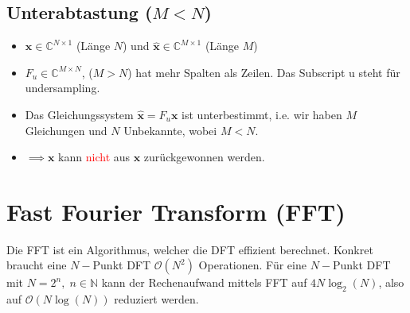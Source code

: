 \documentclass[11pt]{article}
\begin{document}
\vspace*{-0.25cm}
\subsection*{Unterabtastung ($M < N$)}
\vspace*{-0.5cm}
\begin{itemize}
    \item $\mathbf{x} \in \mathbb{C}^{N \times 1}$ (Länge $N$) und $\hat{\mathbf{x}} \in \mathbb{C}^{M \times 1}$ (Länge $M$)
    \item $F_u \in \mathbb{C}^{M\times N}$, ($M > N$) hat mehr Spalten als Zeilen. Das Subscript u steht für undersampling.
    \item Das Gleichungssystem $\hat{\mathbf{x}} = F_u \mathbf{x}$ ist unterbestimmt, i.e. wir haben $M$ Gleichungen und $N$ Unbekannte, wobei $M < N$.
    \item[] $\implies \mathbf{x}$ kann \textcolor{red}{nicht} aus $\mathbf{x}$ zurückgewonnen werden.
\end{itemize}


\vfill \null
\pagebreak

\section*{Fast Fourier Transform (FFT)}
\vspace*{-0.5cm}
Die FFT ist ein Algorithmus, welcher die DFT effizient berechnet. Konkret braucht eine $N-$Punkt DFT $\mathcal{O}(N^2)$ Operationen. Für eine $N-$Punkt DFT mit $N=2^n, \; n \in \mathbb{N}$ kann der Rechenaufwand mittels FFT auf $4N \log_2(N)$, also auf $\mathcal{O}(N\log(N))$ reduziert werden.

\end{document}
